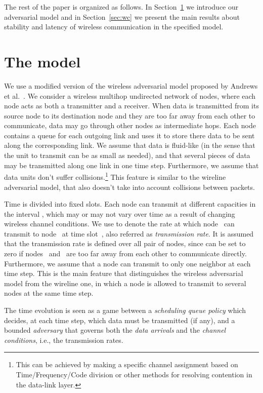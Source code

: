 \documentclass[journal,twocolumn]{./IEEEtran}
\begin{document}
The rest of the paper is organized as follows. In Section~\ref{sec:model} we introduce our adversarial model and in
Section~\ref{sec:wc} we present the main results about stability and latency
of wireless communication in the specified model.




\section{The model}	
\label{sec:model}


We use a modified version of the wireless adversarial model proposed 
by Andrews et al.~\cite{DBLP:journals/talg/AndrewsZ07}. We consider a wireless multihop undirected network of  nodes, where each node acts as both a transmitter and a receiver. When data is transmitted from its source node to its destination node and they are too far away from each other to communicate, data may go through other nodes as intermediate hops. Each node contains a queue for each outgoing link and uses it to store there data to be sent along the corresponding link. We assume that data is fluid-like (in the sense that the unit to transmit can be as small as needed), and that several pieces of data may be transmitted along one link in one time step. Furthermore, we assume that data units don't suffer collisions.\footnote{This can be achieved by making a specific channel assignment based on Time/Frequency/Code division or other methods for resolving contention in the data-link layer.} This feature is similar to the wireline adversarial model, that also doesn't take into account collisions between packets.

Time is divided into fixed slots. Each node can transmit at different  capacities in the interval , which may or may not vary over time as a result of changing wireless channel conditions. We use  to denote the rate at which node~ can transmit to node~ at time slot~, also referred as \emph{transmission rate}. It is assumed that the transmission rate is defined over all pair of nodes, since  can be set to zero if nodes~ and~ are too far away from each other to communicate directly. Furthermore, we assume that a node can transmit to only one neighbor at each time step. This is the main feature that distinguishes the wireless adversarial model from the wireline one, in which a node is allowed to transmit to several nodes at the same time step.

The time evolution is seen as a game between a \emph{scheduling queue policy} which decides, at each time step, which data must be transmitted (if any), and a bounded \emph{adversary} that governs both the \emph{data arrivals} and the \emph{channel conditions}, i.e., the transmission rates.
\end{document}

